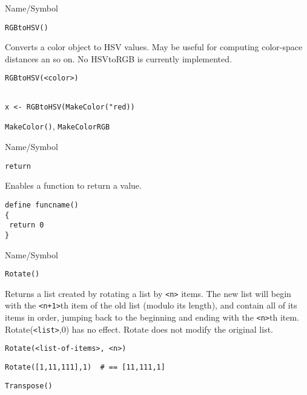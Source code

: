 \begin{desc}{Name/Symbol}
\item[Name/Symbol]  \verb+RGBtoHSV()+

\item[Description]  Converts a color object to HSV values.  May be useful for computing color-space
distances an so on.  No HSVtoRGB is currently implemented.

\item[Usage]        	
\begin{verbatim}
RGBtoHSV(<color>)
\end{verbatim}
			  
\item[Example]     	
\begin{verbatim}

x <- RGBtoHSV(MakeColor("red))

\end{verbatim}

\item[See Also]	
   \verb+MakeColor()+, \verb+MakeColorRGB+
\end{desc}

\begin{desc}{Name/Symbol}
\item[Name/Symbol] 	\verb+return+

\item[Description]  	Enables a function to return a value.

\item[Usage]
\begin{verbatim}
define funcname()
{
 return 0
}
\end{verbatim}

\item[Example]	

\item[See Also]	
\end{desc}

\begin{desc}{Name/Symbol}
\item[Name/Symbol]	\verb+Rotate()+

\item[Description] 	Returns a list created by rotating a list by \verb!<n>! items.  
		The new list will begin with the \verb!<n+1>!th item of the old 
		list (modulo its length), and contain all of its items in 
		order, jumping back to the beginning and ending with the \verb!<n>!th
		item. Rotate(\verb!<list>!,0) has no effect.  Rotate does not modify 
		the original list.

\item[Usage]
\begin{verbatim}
Rotate(<list-of-items>, <n>)
\end{verbatim}

\item[Example]     	
\begin{verbatim}
Rotate([1,11,111],1)  # == [11,111,1]
\end{verbatim}

\item[See Also]    	\verb+Transpose()+
\end{desc}



